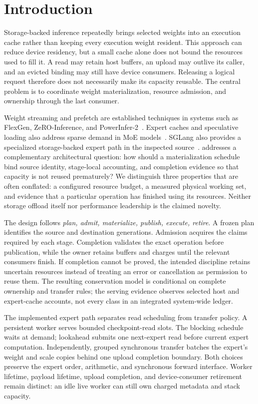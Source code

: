 \section{Introduction}
\label{sec:introduction}

Storage-backed inference repeatedly brings selected weights into an execution
cache rather than keeping every execution weight resident. This approach can
reduce device residency, but a small cache alone does not bound the resources
used to fill it. A read may retain host buffers, an upload may outlive its
caller, and an evicted binding may still have device consumers. Releasing a
logical request therefore does not necessarily make its capacity reusable.
The central problem is to coordinate weight materialization, resource admission,
and ownership through the last consumer.

Weight streaming and prefetch are established techniques in systems such as
FlexGen, ZeRO-Inference, and PowerInfer-2~\cite{sheng2023flexgen,deepspeed2022zeroinference,xue2024powerinfer2}.
Expert caches and speculative loading also address sparse demand in MoE
models~\cite{xue2024moeinfinity,eliseev2023fastmoeoffloading}.
SGLang also provides a specialized storage-backed expert path in the inspected
source~\cite{sglang2026expertpack}.
\system{} addresses a complementary architectural question: how should a
materialization schedule bind source identity, stage-local accounting, and
completion evidence so that capacity is not reused prematurely? We distinguish
three properties that are often conflated: a configured resource budget, a
measured physical working set, and evidence that a particular operation has
finished using its resources. Neither storage offload itself nor performance
leadership is the claimed novelty.

The design follows \emph{plan, admit, materialize, publish, execute, retire}.
A frozen plan identifies the source and destination generations. Admission
acquires the claims required by each stage. Completion validates the exact
operation before publication, while the owner retains buffers and charges
until the relevant consumers finish. If completion cannot be proved, the
intended discipline retains uncertain resources instead of treating an error
or cancellation as permission to reuse them. The resulting conservation model
is conditional on complete ownership and transfer rules; the serving evidence
observes selected host and expert-cache accounts, not every class in an
integrated system-wide ledger.

The implemented expert path separates read scheduling from transfer policy.
A persistent worker serves bounded checkpoint-read slots. The blocking schedule
waits at demand; lookahead submits one next-expert read before current expert
computation. Independently, grouped synchronous transfer batches the expert's
weight and scale copies behind one upload completion boundary. Both choices
preserve the expert order, arithmetic, and synchronous forward interface.
Worker lifetime, payload lifetime, upload completion, and device-consumer
retirement remain distinct: an idle live worker can still own charged metadata
and stack capacity.

